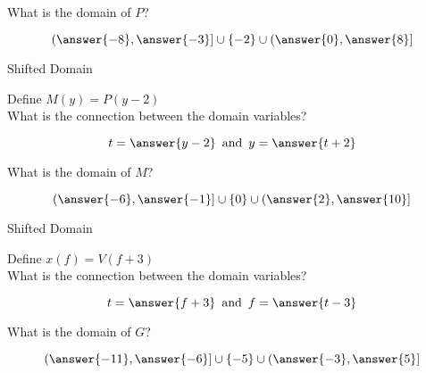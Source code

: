 \documentclass{ximera}
\begin{document}
\begin{exercise}
\begin{question}
What is the domain of $P$?

\[
\left( \answer{-8} , \answer{-3} \right]  \cup  \{ -2 \}  \cup  \left( \answer{0} , \answer{8} \right]
\]


\end{question}












\begin{question} Shifted Domain 

Define $M(y) = P(y - 2)$ \\


What is the connection between the domain variables? 


\[
t = \answer{y-2} \, \text{ and } \,  y = \answer{t+2}
\]

What is the domain of $M$?

\[
\left( \answer{-6} , \answer{-1} \right]  \cup  \{ 0 \}  \cup  \left( \answer{2} , \answer{10} \right]
\]


\end{question}















\begin{question} Shifted Domain 

Define $x(f) = V(f + 3)$ \\

What is the connection between the domain variables? 


\[
t = \answer{f+3} \, \text{ and } \,  f = \answer{t-3}
\]



What is the domain of $G$?

\[
\left( \answer{-11} , \answer{-6} \right]  \cup  \{ -5 \}  \cup  \left( \answer{-3} , \answer{5} \right]
\]


\end{question}







\end{exercise}
\end{document}
